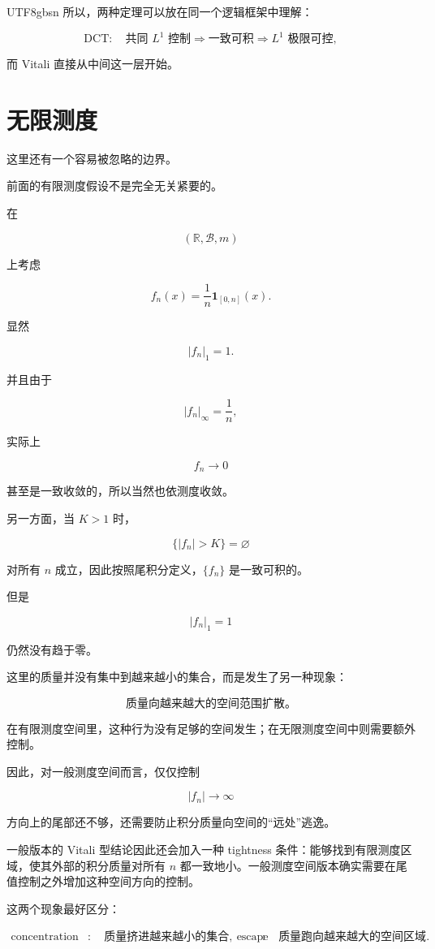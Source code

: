 \documentclass[11pt]{article}
\begin{document}
\begin{CJK*}{UTF8}{gbsn}
所以，两种定理可以放在同一个逻辑框架中理解：

\[
\text{DCT}
:
\quad
\text{共同 }L^1\text{ 控制}
\Longrightarrow
\text{一致可积}
\Longrightarrow
L^1\text{ 极限可控},
\]

而 Vitali 直接从中间这一层开始。


\section{无限测度}


这里还有一个容易被忽略的边界。

前面的有限测度假设不是完全无关紧要的。

在

\[
(\mathbb R,\mathcal B,m)
\]

上考虑

\[
f_n(x)
=
\frac1n\mathbf1_{[0,n]}(x).
\]

显然

\[
|f_n|_1=1.
\]

并且由于

\[
|f_n|_\infty=\frac1n,
\]

实际上

\[
f_n\to0
\]

甚至是一致收敛的，所以当然也依测度收敛。

另一方面，当 $K>1$ 时，

\[
\{|f_n|>K\}=\varnothing
\]

对所有 $n$ 成立，因此按照尾积分定义，$\{f_n\}$ 是一致可积的。

但是

\[
|f_n|_1=1
\]

仍然没有趋于零。

这里的质量并没有集中到越来越小的集合，而是发生了另一种现象：

\[
\text{质量向越来越大的空间范围扩散。}
\]

在有限测度空间里，这种行为没有足够的空间发生；在无限测度空间中则需要额外控制。

因此，对一般测度空间而言，仅仅控制

\[
|f_n|\to\infty
\]

方向上的尾部还不够，还需要防止积分质量向空间的“远处”逃逸。

一般版本的 Vitali 型结论因此还会加入一种 tightness 条件：能够找到有限测度区域，使其外部的积分质量对所有 $n$ 都一致地小。一般测度空间版本确实需要在尾值控制之外增加这种空间方向的控制。

这两个现象最好区分：

\[
\boxed{
\begin{aligned}
\text{concentration}
&:\quad
\text{质量挤进越来越小的集合},\
\text{escape}
&:\quad
\text{质量跑向越来越大的空间区域}.
\end{aligned}
}
\]


\end{CJK*}
\end{document}

